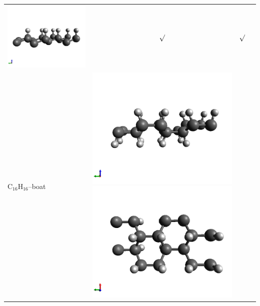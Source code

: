 \documentclass[11pt]{article}
\begin{document}
\begin{table}[h!]
\begin{tabular}[b]{ l c c c }
	\includegraphics[width=0.12\tw]{../structures_figures/c16h8_up-structure2.png} &
	{ $\surd$} & { $\surd$} \\
	{ C$_{16}$H$_{16}$--boat} & 	
	\includegraphics[width=0.12\tw]{../structures_figures/c16h16-boat-structure1.png} 
	\includegraphics[width=0.12\tw]{../structures_figures/c16h16-boat-structure2.png} &

\end{tabular}
\end{table}
\end{document}
